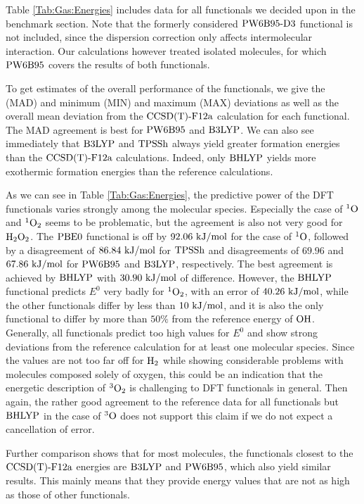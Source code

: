 Table \ref{Tab:Gas:Energies} includes data for all functionals we decided upon
in the benchmark section. Note that the formerly considered $\text{PW6B95}\text{-D3}$ functional
is not included, since the dispersion correction only affects intermolecular
interaction. Our calculations however treated isolated molecules, for which
$\text{PW6B95}$ covers the results of both functionals.

To get estimates of the overall performance of the functionals,
we give the  (MAD) and minimum (MIN)
and maximum (MAX) deviations as well as the overall mean deviation
from the $\text{CCSD(T)-F12a}$ calculation for each functional. The MAD agreement is
best for $\text{PW6B95}$ and $\text{B3LYP}$. We can also see immediately
that $\text{B3LYP}$ and $\text{TPSSh}$ always yield greater formation energies
than the $\text{CCSD(T)-F12a}$ calculations. Indeed, only $\text{BHLYP}$ yields 
more exothermic formation energies than the reference calculations.

As we can see in Table \ref{Tab:Gas:Energies}, the predictive power
of the DFT functionals varies strongly among the molecular species.
Especially the case of ${^1\text{O}}$ and ${^1\text O_2}$ seems to be problematic, but
the agreement is also not very good for $\text H _2 \text O_2$. The $\text{PBE0}$ functional
is off by $92.06~\text {kJ/mol}$ for the case of ${^1\text{O}}$, followed
by a disagreement of $86.84~\text {kJ/mol}$ for $\text{TPSSh}$ and disagreements
of $69.96$ and $67.86~\text {kJ/mol}$ for $\text{PW6B95}$ and $\text{B3LYP}$, respectively.
The best agreement is achieved by $\text{BHLYP}$ with $30.90~\text {kJ/mol}$ of
difference. However, the $\text{BHLYP}$ functional predicts 
$E^0$ very badly for ${^1\text O_2}$, with an error of $40.26~\text {kJ/mol}$,
while the other functionals differ by less than $10~\text {kJ/mol}$, and it is also
the only functional to differ by more than $50\%$ from the reference energy
of $\text O \text H$. Generally, all functionals predict too high values for $E^0$
and show strong deviations from the reference calculation for at least one
molecular species.
Since the values are not too far off for $\text H_2$ while showing
considerable problems with molecules composed solely of oxygen,
this could be an indication that the energetic description of ${^3\text O_2}$
is challenging to DFT functionals in general. Then again, the rather good
agreement to the reference data for all functionals but $\text{BHLYP}$ in the case
of ${^3\text{O}}$ does not support this claim if we do not expect
a cancellation of error. 

Further comparison shows that for most molecules, the functionals
closest to the $\text{CCSD(T)-F12a}$ energies are $\text{B3LYP}$ and $\text{PW6B95}$, which
also yield similar results. This mainly means that they provide
energy values that are not as high as those of other functionals. 


